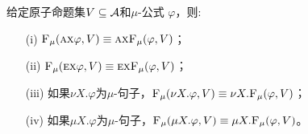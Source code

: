 \begin{proposition}[同质性]\label{chapter06:pro:mu:forget:2}
	给定原子命题集$V\subseteq\cal A$和$\mu$-公式 $\varphi$，则: %
	\begin{itemize}
		\item[(i)] ${\textsc{F}_{\textsc{$\mu$}}}(\textsc{a}\textsc{x}\varphi,V)\equiv \textsc{a}\textsc{x} {\textsc{F}_{\textsc{$\mu$}}}(\varphi,V)$；
		\item[(ii)] ${\textsc{F}_{\textsc{$\mu$}}}(\textsc{e}\textsc{x}\varphi,V)\equiv\textsc{e}\textsc{x} {\textsc{F}_{\textsc{$\mu$}}}(\varphi,V)$；
		\item[(iii)] 如果$\nu X. \varphi$为$\mu$-句子，${\textsc{F}_{\textsc{$\mu$}}}(\nu X. \varphi, V) \equiv \nu X. {\textsc{F}_{\textsc{$\mu$}}}(\varphi, V)$；
		\item[(iv)] 如果$\mu X. \varphi$为$\mu$-句子，${\textsc{F}_{\textsc{$\mu$}}}(\mu X. \varphi, V) \equiv \mu X. {\textsc{F}_{\textsc{$\mu$}}}(\varphi, V)$。
	\end{itemize}
\end{proposition}
